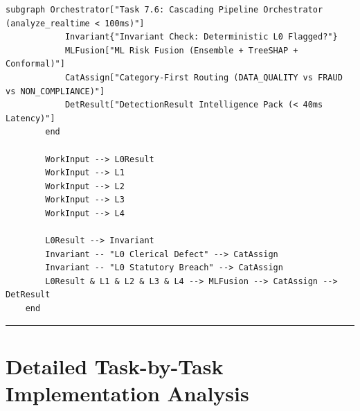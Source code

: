 \documentclass[11pt,a4paper]{article}
\begin{document}
\begin{tcolorbox}[colback=gray!5!white,colframe=gray!60!black,arc=1mm,boxrule=0.6pt,left=6pt,right=6pt,top=6pt,bottom=6pt]
\begin{lstlisting}[basicstyle=\ttfamily\scriptsize,breaklines=true,columns=flexible]
        subgraph Orchestrator["Task 7.6: Cascading Pipeline Orchestrator (analyze_realtime < 100ms)"]
            Invariant{"Invariant Check: Deterministic L0 Flagged?"}
            MLFusion["ML Risk Fusion (Ensemble + TreeSHAP + Conformal)"]
            CatAssign["Category-First Routing (DATA_QUALITY vs FRAUD vs NON_COMPLIANCE)"]
            DetResult["DetectionResult Intelligence Pack (< 40ms Latency)"]
        end

        WorkInput --> L0Result
        WorkInput --> L1
        WorkInput --> L2
        WorkInput --> L3
        WorkInput --> L4
        
        L0Result --> Invariant
        Invariant -- "L0 Clerical Defect" --> CatAssign
        Invariant -- "L0 Statutory Breach" --> CatAssign
        L0Result & L1 & L2 & L3 & L4 --> MLFusion --> CatAssign --> DetResult
    end
\end{lstlisting}
\end{tcolorbox}


\vspace{1em}\hrule\vspace{1em}

\section{Detailed Task-by-Task Implementation Analysis}
\end{document}
